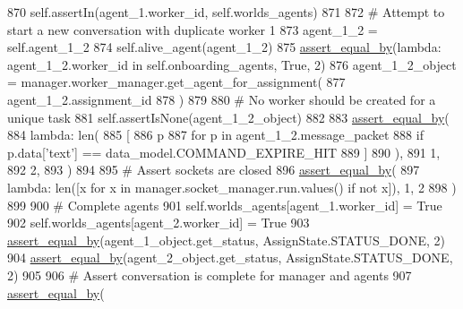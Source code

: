 \begin{DoxyCode}
870         self.assertIn(agent\_1.worker\_id, self.worlds\_agents)
871 
872         \textcolor{comment}{# Attempt to start a new conversation with duplicate worker 1}
873         agent\_1\_2 = self.agent\_1\_2
874         self.alive\_agent(agent\_1\_2)
875         \hyperlink{namespaceparlai_1_1mturk_1_1core_1_1test_1_1test__full__system_a0b463246d35658a2e422010f13dcf819}{assert\_equal\_by}(\textcolor{keyword}{lambda}: agent\_1\_2.worker\_id \textcolor{keywordflow}{in} self.onboarding\_agents, \textcolor{keyword}{True}, 2)
876         agent\_1\_2\_object = manager.worker\_manager.get\_agent\_for\_assignment(
877             agent\_1\_2.assignment\_id
878         )
879 
880         \textcolor{comment}{# No worker should be created for a unique task}
881         self.assertIsNone(agent\_1\_2\_object)
882 
883         \hyperlink{namespaceparlai_1_1mturk_1_1core_1_1test_1_1test__full__system_a0b463246d35658a2e422010f13dcf819}{assert\_equal\_by}(
884             \textcolor{keyword}{lambda}: len(
885                 [
886                     p
887                     \textcolor{keywordflow}{for} p \textcolor{keywordflow}{in} agent\_1\_2.message\_packet
888                     \textcolor{keywordflow}{if} p.data[\textcolor{stringliteral}{'text'}] == data\_model.COMMAND\_EXPIRE\_HIT
889                 ]
890             ),
891             1,
892             2,
893         )
894 
895         \textcolor{comment}{# Assert sockets are closed}
896         \hyperlink{namespaceparlai_1_1mturk_1_1core_1_1test_1_1test__full__system_a0b463246d35658a2e422010f13dcf819}{assert\_equal\_by}(
897             \textcolor{keyword}{lambda}: len([x \textcolor{keywordflow}{for} x \textcolor{keywordflow}{in} manager.socket\_manager.run.values() \textcolor{keywordflow}{if} \textcolor{keywordflow}{not} x]), 1, 2
898         )
899 
900         \textcolor{comment}{# Complete agents}
901         self.worlds\_agents[agent\_1.worker\_id] = \textcolor{keyword}{True}
902         self.worlds\_agents[agent\_2.worker\_id] = \textcolor{keyword}{True}
903         \hyperlink{namespaceparlai_1_1mturk_1_1core_1_1test_1_1test__full__system_a0b463246d35658a2e422010f13dcf819}{assert\_equal\_by}(agent\_1\_object.get\_status, AssignState.STATUS\_DONE, 2)
904         \hyperlink{namespaceparlai_1_1mturk_1_1core_1_1test_1_1test__full__system_a0b463246d35658a2e422010f13dcf819}{assert\_equal\_by}(agent\_2\_object.get\_status, AssignState.STATUS\_DONE, 2)
905 
906         \textcolor{comment}{# Assert conversation is complete for manager and agents}
907         \hyperlink{namespaceparlai_1_1mturk_1_1core_1_1test_1_1test__full__system_a0b463246d35658a2e422010f13dcf819}{assert\_equal\_by}(

\end{DoxyCode}
